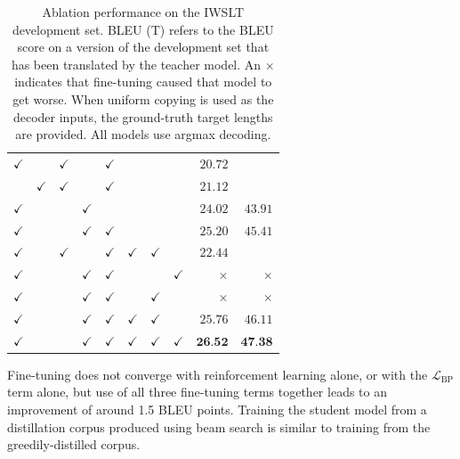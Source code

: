 \begin{table}[hptb]
\begin{tabular}{cc|ccc|ccc|rr}
$\checkmark$&  & $\checkmark$ &              & $\checkmark$  & & & & $20.72$\\
&  $\checkmark$& $\checkmark$ &              & $\checkmark$  & & & & $21.12$ \\
$\checkmark$&  &              & $\checkmark$ &               & & & & $24.02$ & $43.91$ \\
$\checkmark$&  &              & $\checkmark$ & $\checkmark$  & & & & $25.20$ & $45.41$ \\
\midrule
$\checkmark$&  & $\checkmark$ &  & $\checkmark$& $\checkmark$ & $\checkmark$ & & $22.44$ \\
$\checkmark$&  &              & $\checkmark$ & $\checkmark$  & & & $\checkmark$ & $\times$ & $\times$\\
$\checkmark$&  &              & $\checkmark$ & $\checkmark$  & & $\checkmark$ & & $\times$ & $\times$\\
$\checkmark$&  &              & $\checkmark$ & $\checkmark$  & $\checkmark$ & $\checkmark$ &  & $25.76$ & $46.11$\\
$\checkmark$&  &              & $\checkmark$ & $\checkmark$  & $\checkmark$ & $\checkmark$ & $\checkmark$ & $ \textbf{26.52}$ & $\textbf{47.38}$\\
\bottomrule
\end{tabular}
\caption{Ablation performance on the IWSLT development set. BLEU (T) refers to the BLEU score on a version of the development set that has been translated by the teacher model. An $\times$ indicates that fine-tuning caused that model to get worse. When uniform copying is used as the decoder inputs, the ground-truth target lengths are provided. All models use argmax decoding.}
\end{table}

Fine-tuning does not converge with reinforcement learning alone, or with the $\mathcal{L}_\text{BP}$ term alone, but use of all three fine-tuning terms together leads to an improvement of around 1.5 BLEU points. Training the student model from a distillation corpus produced using beam search is similar to training from the greedily-distilled corpus.

